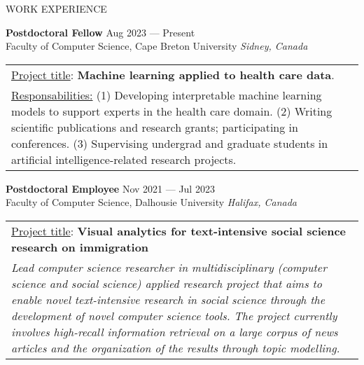 \documentclass{resume} %
\begin{document}
\begin{rSection}{WORK EXPERIENCE}
\item \textbf{\large Postdoctoral Fellow} \hfill Aug 2023 --- Present\\\smallskip
Faculty of Computer Science, Cape Breton University \hfill \textit{Sidney, Canada}\\
\begin{table}[!ht]
\vspace{-0.7cm}
    \begin{tabular}{|p{\textwidth}}
\underline{Project title}: \textbf{Machine learning applied to health care data}. \\
\underline{Responsabilities:} (1) Developing interpretable machine learning models to support experts in the health care domain. (2) Writing scientific publications and research grants; participating in conferences. (3) Supervising undergrad and graduate students in artificial intelligence-related research projects.\\
\end{tabular}\vspace{-0.7cm}
\end{table}

\bigskip


\item \textbf{\large Postdoctoral Employee} \hfill Nov 2021 --- Jul 2023\\\smallskip
Faculty of Computer Science, Dalhousie University \hfill \textit{Halifax, Canada}\\
\begin{table}[!ht]
\vspace{-0.7cm}
    \begin{tabular}{|p{\textwidth}}
\underline{Project title}: \textbf{Visual analytics for text-intensive social science research on immigration}\\
\textit{Lead computer science researcher in multidisciplinary (computer science and social science) applied research project that aims to enable novel text-intensive research in social science through the development of novel computer science tools. The project currently involves high-recall information retrieval on a large corpus of news articles and the organization of the results through topic modelling. }
    \end{tabular}\vspace{-0.7cm}
\end{table}\newpage




\end{rSection}
\end{document}
